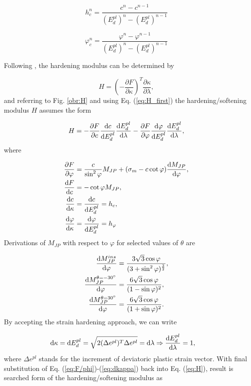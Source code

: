 \begin{equation}\label{eq:h_c}
	h_c^n = \dfrac{c^n-c^{n-1}}{(E_d^{pl})^{n}-(E_d^{pl})^{n-1}}
\end{equation}

\begin{equation}\label{eq:h_phi}
 	\varphi_c^n = \dfrac{\varphi^n-\varphi^{n-1}}{(E_d^{pl})^{n}-(E_d^{pl})^{n-1}}
\end{equation}

Following \cite{geofem}, the hardening modulus can be determined by

\begin{equation}\label{eq:H_first}
	H = \left(-\dfrac{\partial F}{\partial \kappa}\right)^T \dfrac{\partial \kappa}{\partial \lambda},
\end{equation}
and referring to Fig. \ref{obr:H} and using Eq. (\ref{eq:H_first}) the hardening/softening modulus $H$ assumes the form 

\begin{equation}\label{eq:H}
	H = - \pdv{F}{c} \dv{c}{E_d^{pl}} \dv{E_d^{pl}}{\lambda} - \pdv{F}{\varphi} \dv{\varphi}{E_d^{pl}} \dv{E_d^{pl}}{\lambda},
\end{equation}
where

\begin{align}
\pdv{F}{\varphi}& = \dfrac{c}{\sin^2\varphi} M_{JP} + (\sigma_m - c\cot \varphi) \dv{M_{JP}}{\varphi},\label{eq:F/phi}\\
\dv{F}{c}& = - \cot \varphi M_{JP},\\
\dv{c}{\kappa}& = \dv{c}{E_d^{pl}} = h_c,\\
\dv{\varphi}{\kappa}& = \dv{\varphi}{E_d^{pl}} = h_\varphi
\end{align}
Derivations of $M_{JP}$ with respect to $\varphi$ for selected values of $\theta$ are

\begin{align}
	\dv{M_{JP}^{ins}}{\varphi}					& = \dfrac{3\sqrt{3}\cos \varphi}{(3 + \sin^2 \varphi)^{\frac{3}{2}}},\\
	\dv{M_{JP}^{\theta = \ang{-30}}}{\varphi}	& = \dfrac{6\sqrt{3}\cos \varphi}{(1-\sin \varphi)^2},\\
	\dv{M_{JP}^{\theta = \ang{30}}}{\varphi}	& = \dfrac{6\sqrt{3}\cos \varphi}{(1+\sin \varphi)^2}.
\end{align}
By accepting the strain hardening approach, we can write

\begin{align}\label{eq:dkappa}
	\dd\kappa& = \dd E_d^{pl} = \sqrt{2(\Delta e^{pl})^T \Delta e^{pl} } = \dd \lambda \Rightarrow \dv{E_d^{pl}}{\lambda} = 1,
\end{align}
where  $\Delta e^{pl}$ stands for the increment of deviatoric plastic strain vector. With final substitution of Eq. (\ref{eq:F/phi})-(\ref{eq:dkappa}) back into Eq. (\ref{eq:H}), result is searched form of the hardening/softening modulus as

